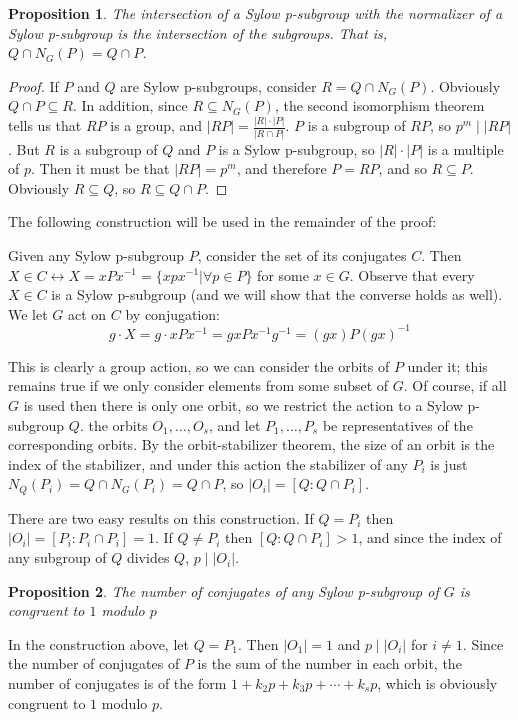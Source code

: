 \documentclass[12pt]{article}
\newtheorem{proposition}{Proposition}
\begin{document}
\begin{proposition}
The intersection of a Sylow p-subgroup with the normalizer of a Sylow p-subgroup is the intersection of the subgroups.  That is, $Q\cap N_G(P)=Q\cap P$.
\end{proposition}
\begin{proof} If $P$ and $Q$ are Sylow p-subgroups, consider $R=Q\cap N_G(P)$.  Obviously $Q\cap P\subseteq R$.  In addition, since $R\subseteq N_G(P)$, the second isomorphism theorem tells us that $RP$ is a group, and $|RP|=\frac{|R|\cdot|P|}{|R\cap P|}$.  $P$ is a subgroup of $RP$, so $p^m\mid |RP|$.  But $R$ is a subgroup of $Q$ and $P$ is a Sylow p-subgroup, so $|R|\cdot |P|$ is a multiple of $p$.  Then it must be that $|RP|=p^m$, and therefore $P=RP$, and so $R\subseteq P$.  Obviously $R\subseteq Q$, so $R\subseteq Q\cap P$.
\end{proof}

The following construction will be used in the remainder of the proof:

Given any Sylow p-subgroup $P$, consider the set of its conjugates $C$.  Then 
$X\in C\leftrightarrow X=xPx^{-1}=\{xpx^{-1}|\forall p\in P\}$ for some $x\in 
G$.  Observe that every $X\in C$ is a Sylow p-subgroup (and we will show that 
the converse holds as well).  We let $G$ act on $C$ by conjugation:
\begin{displaymath}
g\cdot X=g\cdot xPx^{-1}=gxPx^{-1}g^{-1}=(gx)P(gx)^{-1}
\end{displaymath}

This is clearly a group action, so we can consider the orbits of $P$ under it; this remains true if we only consider elements from some subset of $G$.  Of course, if all $G$ is used then there is only one orbit, so we restrict the action to a Sylow p-subgroup $Q$.   the orbits $O_1,\ldots, O_s$, and let $P_1,\ldots, P_s$ be representatives of the corresponding orbits.  By the orbit-stabilizer theorem, the size of an orbit is the index of the stabilizer, and under this action the stabilizer of any $P_i$ is just $N_Q(P_i)=Q\cap N_G(P_i)=Q\cap P$, so $|O_i|=[Q:Q\cap P_i]$.

There are two easy results on this construction.  If $Q=P_i$ then $|O_i|=[P_i:P_i\cap P_i]=1$.  If $Q\neq P_i$ then $[Q:Q\cap P_i]>1$, and since the index of any subgroup of $Q$ divides $Q$, $p\mid |O_i|$.

\begin{proposition}
The number of conjugates of any Sylow p-subgroup of $G$ is congruent to $1$ modulo $p$
\end{proposition}
In the construction above, let $Q=P_1$.  Then $|O_1|=1$ and $p\mid |O_i|$ for $i\neq 1$.  Since the number of conjugates of $P$ is the sum of the number in each orbit, the number of conjugates is of the form $1+k_2p+k_3p+\cdots+k_sp$, which is obviously congruent to $1$ modulo $p$.
\end{document}
